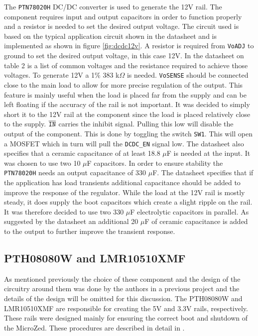 The \texttt{PTN78020H} DC/DC converter is used to generate the 12V rail. 
The component requires input and output capacitors in order to function properly and a resistor is needed to set the desired output voltage. 
The circuit used is based on the typical application circuit shown in the datasheet \cite{PTN78020H} and is implemented as shown in figure \ref{fig:dcdc12v}.
A resistor is required from \texttt{VoADJ} to ground to set the desired output voltage, in this case 12V.
In the datasheet on table 2 is a list of common voltages and the resistance required to achieve those voltages.
To generate 12V a 1\% 383 k$\Omega$ is needed.
\texttt{VoSENSE} should be connected close to the main load to allow for more precise regulation of the output.
This feature is mainly useful when the load is placed far from the supply and can be left floating if the accuracy of the rail is not important.
It was decided to simply short it to the 12V rail at the component since the load is placed relatively close to the supply.
$\overline{\text{\texttt{IN}}}$ carries the inhibit signal.
Pulling this low will disable the output of the component.
This is done by toggling the switch \texttt{SW1}. 
This will open a MOSFET which in turn will pull the \texttt{DCDC\_EN} signal low.
The datasheet also specifies that a ceramic capacitance of at least 18.8 $\mu$F is needed at the input. 
It was chosen to use two 10 $\mu$F capacitors.
In order to ensure stability the \texttt{PTN78020H} needs an output capacitance of 330 $\mu$F.
The datasheet specifies that if the application has load transients additional capacitance should be added to improve the response of the regulator.
While the load at the 12V rail is mostly steady, it does supply the boot capacitors which create a slight ripple on the rail.
It was therefore decided to use two 330 $\mu$F electrolytic capacitors in parallel.
As suggested by the datasheet an additional 20 $\mu$F of ceramic capacitance is added to the output to further improve the transient response.\\

\subsection{PTH08080W and LMR10510XMF} %
\label{sub:pth08080w}
As mentioned previously the choice of these component and the design of the circuitry around them was done by the authors in a previous project \cite{isaswarm} and the details of the design will be omitted for this discussion.
The PTH08080W and LMR10510XMF are responsible for creating the 5V and 3.3V rails, respectively.
These rails were designed mainly for ensuring the correct boot and shutdown of the MicroZed.
These procedures are described in detail in \cite{isaswarm}.

